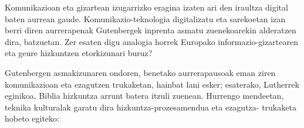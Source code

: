 \clearpage



\begin{multicols}{2}
    Komunikazioan eta gizartean izugarrizko eragina izaten ari den iraultza digital baten aurrean gaude. Komunikazio-teknologia digitalizatu eta sarekoetan izan berri diren aurrerapenak Gutenbergek inprenta asmatu zuenekoarekin alderatzen dira, batzuetan. Zer esaten digu analogia horrek Europako informazio-gizartearen eta geure hizkuntzen etorkizunari buruz?

Gutenbergen asmakizunaren ondoren, benetako aurrerapausoak eman ziren komunikazioan eta ezagutzen trukaketan, hainbat lani esker; esaterako, Lutherrek eginikoa, Biblia hizkuntza arrunt batera itzuli zuenean. Hurrengo mendeetan, teknika kulturalak garatu dira hizkuntza-prozesamendua eta ezagutza- trukaketa hobeto egiteko:
 

\end{multicols}
